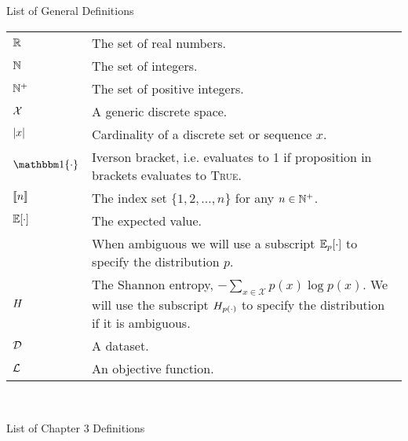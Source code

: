 List of General Definitions \\


\begin{tabular}{l l}
    $\mathbb{R}$ & The set of real numbers.\\
    $\mathbb{N}$ & The set of integers.\\
    $\mathbb{N}^{+}$ & The set of positive integers.\\
    $\mathcal{X}$ & A generic discrete space. \\ 
    $| x |$ & Cardinality of a discrete set or sequence $x$. \\
    $\Ind{\cdot}$ & Iverson bracket, i.e. evaluates to 1 if proposition in brackets evaluates to \textsc{True}.\\
    $\llbracket n \rrbracket$ & The index set $\{1, 2, \ldots, n\}$ for any $n \in \mathbb{N}^{+}$.\\
    $\mathbb{E}[\cdot]$ & The expected value. \\
    & When ambiguous we will use a subscript
                   $\mathbb{E}_p[\cdot]$ to specify the distribution $p$. \\
    $H$ & The Shannon entropy, 
                    $-\sum_{x \in \mathcal{X}} p(x) \log p(x)$.
                  We will use the subscript $H_{p(\cdot)}$
                 to specify the distribution if it is ambiguous.\\
    $\mathcal{D}$ & A dataset.\\
    $\mathcal{L}$ & An objective function.\\
\end{tabular}

~\\

\pagebreak

List of Chapter 3 Definitions\\

